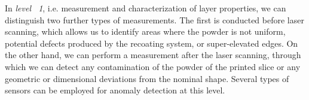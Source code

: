 In \emph{level ~1}, i.e. measurement and characterization of layer properties, we can distinguish two further types of measurements. The first is conducted before laser scanning, which allows us to identify areas where the powder is not uniform, potential defects produced by the recoating system, or super-elevated edges. On the other hand, we can perform a measurement after the laser scanning, through which we can detect any contamination of the powder of the printed slice or any geometric or dimensional deviations from the nominal shape. Several types of sensors can be employed for anomaly detection at this level.
\begin{figure}
    \centering
    \qquad
\end{figure}
